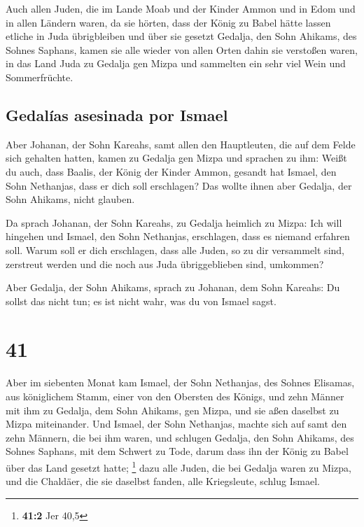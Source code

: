  Auch allen Juden, die im Lande Moab und der Kinder Ammon
und in Edom und in allen Ländern waren, da sie hörten, dass der König zu
Babel hätte lassen etliche in Juda übrigbleiben und über sie gesetzt
Gedalja, den Sohn Ahikams, des Sohnes Saphans,  kamen sie
alle wieder von allen Orten dahin sie verstoßen waren, in das Land Juda
zu Gedalja gen Mizpa und sammelten ein sehr viel Wein und Sommerfrüchte.

\hypertarget{gedaluxedas-asesinada-por-ismael}{%
\subsection{Gedalías asesinada por
Ismael}\label{gedaluxedas-asesinada-por-ismael}}

 Aber Johanan, der Sohn Kareahs, samt allen den
Hauptleuten, die auf dem Felde sich gehalten hatten, kamen zu Gedalja
gen Mizpa  und sprachen zu ihm: Weißt du auch, dass
Baalis, der König der Kinder Ammon, gesandt hat Ismael, den Sohn
Nethanjas, dass er dich soll erschlagen? Das wollte ihnen aber Gedalja,
der Sohn Ahikams, nicht glauben.

 Da sprach Johanan, der Sohn Kareahs, zu Gedalja heimlich
zu Mizpa: Ich will hingehen und Ismael, den Sohn Nethanjas, erschlagen,
dass es niemand erfahren soll. Warum soll er dich erschlagen, dass alle
Juden, so zu dir versammelt sind, zerstreut werden und die noch aus Juda
übriggeblieben sind, umkommen?

 Aber Gedalja, der Sohn Ahikams, sprach zu Johanan, dem
Sohn Kareahs: Du sollst das nicht tun; es ist nicht wahr, was du von
Ismael sagst.

\hypertarget{section-40}{%
\section{41}\label{section-40}}

 Aber im siebenten Monat kam Ismael, der Sohn Nethanjas,
des Sohnes Elisamas, aus königlichem Stamm, einer von den Obersten des
Königs, und zehn Männer mit ihm zu Gedalja, dem Sohn Ahikams, gen Mizpa,
und sie aßen daselbst zu Mizpa miteinander.  Und Ismael,
der Sohn Nethanjas, machte sich auf samt den zehn Männern, die bei ihm
waren, und schlugen Gedalja, den Sohn Ahikams, des Sohnes Saphans, mit
dem Schwert zu Tode, darum dass ihn der König zu Babel über das Land
gesetzt hatte; \footnote{\textbf{41:2} Jer 40,5}  dazu
alle Juden, die bei Gedalja waren zu Mizpa, und die Chaldäer, die sie
daselbst fanden, alle Kriegsleute, schlug Ismael.

